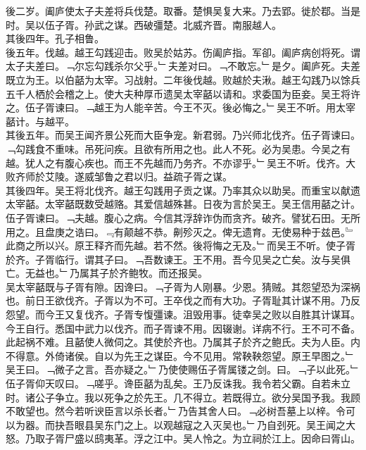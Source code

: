 \documentclass{zhvt-classic}
\begin{document}
\hspace*{2em}後二岁。阖庐使太子夫差将兵伐楚。取番。楚惧吴复大来。乃去郢。徙於鄀。当是时。吴以伍子胥。孙武之谋。西破彊楚。北威齐晋。南服越人。\\
\hspace*{2em}其後四年。孔子相鲁。\\
\hspace*{2em}後五年。伐越。越王勾践迎击。败吴於姑苏。伤阖庐指。军卻。阖庐病创将死。谓太子夫差曰。﹁尔忘勾践杀尔父乎。﹂夫差对曰。﹁不敢忘。﹂是夕。阖庐死。夫差既立为王。以伯嚭为太宰。习战射。二年後伐越。败越於夫湫。越王勾践乃以馀兵五千人栖於会稽之上。使大夫种厚币遗吴太宰嚭以请和。求委国为臣妾。吴王将许之。伍子胥谏曰。﹁越王为人能辛苦。今王不灭。後必悔之。﹂吴王不听。用太宰嚭计。与越平。\\
\hspace*{2em}其後五年。而吴王闻齐景公死而大臣争宠。新君弱。乃兴师北伐齐。伍子胥谏曰。﹁勾践食不重味。吊死问疾。且欲有所用之也。此人不死。必为吴患。今吴之有越。犹人之有腹心疾也。而王不先越而乃务齐。不亦谬乎。﹂吴王不听。伐齐。大败齐师於艾陵。遂威邹鲁之君以归。益疏子胥之谋。\\
\hspace*{2em}其後四年。吴王将北伐齐。越王勾践用子贡之谋。乃率其众以助吴。而重宝以献遗太宰嚭。太宰嚭既数受越赂。其爱信越殊甚。日夜为言於吴王。吴王信用嚭之计。伍子胥谏曰。﹁夫越。腹心之病。今信其浮辞诈伪而贪齐。破齐。譬犹石田。无所用之。且盘庚之诰曰。﹃有颠越不恭。劓殄灭之。俾无遗育。无使易种于兹邑。﹄此商之所以兴。原王释齐而先越。若不然。後将悔之无及。﹂而吴王不听。使子胥於齐。子胥临行。谓其子曰。﹁吾数谏王。王不用。吾今见吴之亡矣。汝与吴俱亡。无益也。﹂乃属其子於齐鲍牧。而还报吴。\\
\hspace*{2em}吴太宰嚭既与子胥有隙。因谗曰。﹁子胥为人刚暴。少恩。猜贼。其怨望恐为深祸也。前日王欲伐齐。子胥以为不可。王卒伐之而有大功。子胥耻其计谋不用。乃反怨望。而今王又复伐齐。子胥专愎彊谏。沮毁用事。徒幸吴之败以自胜其计谋耳。今王自行。悉国中武力以伐齐。而子胥谏不用。因辍谢。详病不行。王不可不备。此起祸不难。且嚭使人微伺之。其使於齐也。乃属其子於齐之鲍氏。夫为人臣。内不得意。外倚诸侯。自以为先王之谋臣。今不见用。常鞅鞅怨望。原王早图之。﹂吴王曰。﹁微子之言。吾亦疑之。﹂乃使使赐伍子胥属镂之剑。曰。﹁子以此死。﹂伍子胥仰天叹曰。﹁嗟乎。谗臣嚭为乱矣。王乃反诛我。我令若父霸。自若未立时。诸公子争立。我以死争之於先王。几不得立。若既得立。欲分吴国予我。我顾不敢望也。然今若听谀臣言以杀长者。﹂乃告其舍人曰。﹁必树吾墓上以梓。令可以为器。而抉吾眼县吴东门之上。以观越寇之入灭吴也。﹂乃自刭死。吴王闻之大怒。乃取子胥尸盛以鸱夷革。浮之江中。吴人怜之。为立祠於江上。因命曰胥山。\\
\end{document}
